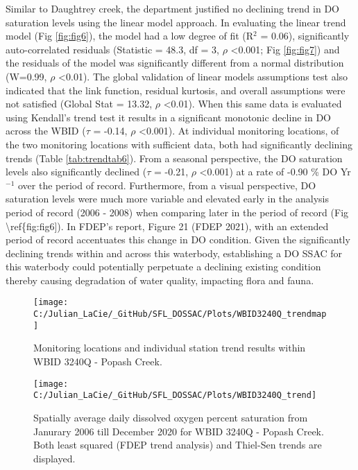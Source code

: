\documentclass[]{interact}
\theoremstyle{plain}%
\theoremstyle{definition}
\theoremstyle{remark}
\begin{document}
Similar to Daughtrey creek, the department justified no declining trend
in DO saturation levels using the linear model approach. In evaluating
the linear trend model (Fig \ref{fig:fig6}), the model had a low degree
of fit (R\(^{2}\) = 0.06), significantly auto-correlated residuals
(Statistic = 48.3, df = 3, \(\rho\) \textless0.001; Fig \ref{fig:fig7})
and the residuals of the model was significantly different from a normal
distribution (W=0.99, \(\rho\) \textless0.01). The global validation of
linear models assumptions test also indicated that the link function,
residual kurtosis, and overall assumptions were not satisfied (Global
Stat = 13.32, \(\rho\) \textless0.01). When this same data is evaluated
using Kendall's trend test it results in a significant monotonic decline
in DO across the WBID (\(\tau\) = -0.14, \(\rho\) \textless0.001). At
individual monitoring locations, of the two monitoring locations with
sufficient data, both had significantly declining trends (Table
\ref{tab:trendtab6}). From a seasonal perspective, the DO saturation
levels also significantly declined (\(\tau\) = -0.21, \(\rho\)
\textless0.001) at a rate of -0.90 \% DO Yr\(^{-1}\) over the period of
record. Furthermore, from a visual perspective, DO saturation levels
were much more variable and elevated early in the analysis period of
record (2006 - 2008) when comparing later in the period of record (Fig
\textbackslash ref\{fig:fig6{]}). In FDEP's report, Figure 21 (FDEP
2021), with an extended period of record accentuates this change in DO
condition. Given the significantly declining trends within and across
this waterbody, establishing a DO SSAC for this waterbody could
potentially perpetuate a declining existing condition thereby causing
degradation of water quality, impacting flora and fauna.

\begin{figure}[H]

{\centering \texttt{[image: C:/Julian\_LaCie/\_GitHub/SFL\_DOSSAC/Plots/WBID3240Q\_trendmap]} 

}

\caption{\label{fig:mapfig5} Monitoring locations and individual station trend results within WBID 3240Q - Popash Creek.}\label{fig:unnamed-chunk-9}
\end{figure}

\begin{figure}[H]

{\centering \texttt{[image: C:/Julian\_LaCie/\_GitHub/SFL\_DOSSAC/Plots/WBID3240Q\_trend]} 

}

\caption{\label{fig:fig6} Spatially average daily dissolved oxygen percent saturation from Janurary 2006 till December 2020 for  WBID 3240Q - Popash Creek. Both least squared (FDEP trend analysis) and Thiel-Sen trends are displayed.}\label{fig:unnamed-chunk-10}
\end{figure}
\end{document}
